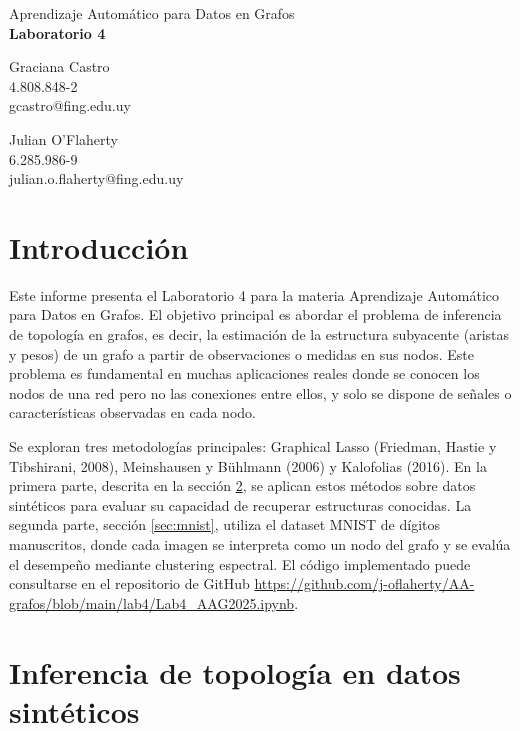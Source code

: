 \documentclass{article}
\begin{document}
\begin{center}
    {\Large Aprendizaje Automático para Datos en Grafos} \\
    {\LARGE \textbf{Laboratorio 4}} \\
    \vspace{2em}
    \begin{minipage}{0.45\textwidth}
        \centering
        Graciana Castro \\
        4.808.848-2 \\
        gcastro@fing.edu.uy
    \end{minipage}
    \hfill
    \begin{minipage}{0.45\textwidth}
        \centering
        Julian O'Flaherty \\
        6.285.986-9 \\
        julian.o.flaherty@fing.edu.uy
    \end{minipage}
\end{center}


\section{Introducción}
Este informe presenta el Laboratorio 4 para la materia Aprendizaje Automático para Datos en Grafos. El objetivo principal es abordar el problema de inferencia de topología en grafos, es decir, la estimación de la estructura subyacente (aristas y pesos) de un grafo a partir de observaciones o medidas en sus nodos. Este problema es fundamental en muchas aplicaciones reales donde se conocen los nodos de una red pero no las conexiones entre ellos, y solo se dispone de señales o características observadas en cada nodo.

Se exploran tres metodologías principales: Graphical Lasso (Friedman, Hastie y Tibshirani, 2008), Meinshausen y Bühlmann (2006) y Kalofolias (2016). En la primera parte, descrita en la sección \ref{sec:datos_sinteticos}, se aplican estos métodos sobre datos sintéticos para evaluar su capacidad de recuperar estructuras conocidas. La segunda parte, sección \ref{sec:mnist}, utiliza el dataset MNIST de dígitos manuscritos, donde cada imagen se interpreta como un nodo del grafo y se evalúa el desempeño mediante clustering espectral. El código implementado puede consultarse en el repositorio de GitHub \url{https://github.com/j-oflaherty/AA-grafos/blob/main/lab4/Lab4_AAG2025.ipynb}.



\section{Inferencia de topología en datos sintéticos}
\label{sec:datos_sinteticos}
\end{document}
